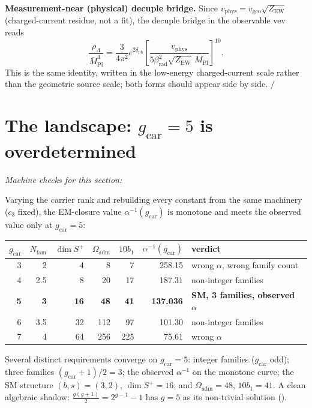 \documentclass[11pt,a4paper]{article}
\newcommand{\Mbar}{\bar M_{\mathrm{Pl}}}
\newcommand{\gcar}{g_{\mathrm{car}}}
\newcommand{\Nfam}{N_{\mathrm{fam}}}
\newcommand{\Oadm}{\Omega_{\mathrm{adm}}}
\newcommand{\cthree}{c_3}
\newcommand{\dph}{\delta_{\mathrm{ph}}}
\newcommand{\betarad}{\beta_{\mathrm{rad}}}
\theoremstyle{definition}
\begin{document}
\noindent\textbf{Measurement-near (physical) decuple bridge.} Since $v_{\mathrm{phys}}=v_{\mathrm{geo}}\sqrt{Z_{\mathrm{EW}}}$
(charged-current residue, not a fit), the decuple bridge in the observable vev reads
\begin{equation}
  \frac{\rho_\Lambda}{\Mbar^4}=\frac{3}{4\pi^2}e^{2\dph}
  \left[\frac{v_{\mathrm{phys}}}{5\betarad^2\sqrt{Z_{\mathrm{EW}}}\,\Mbar}\right]^{10}.
\end{equation}
This is the same identity, written in the low-energy charged-current scale rather than the geometric
source scale; both forms should appear side by side. \mE/\mC

\section{The landscape: $\gcar=5$ is overdetermined}
\noindent\emph{Machine checks for this section:}  


Varying the carrier rank and rebuilding every constant from the same machinery ($\cthree$ fixed),
the EM-closure value $\alpha^{-1}(\gcar)$ is monotone and meets the observed value only at $\gcar=5$:
\begin{center}\small
\begin{tabular}{@{}r r r r r r l@{}}
\toprule
$\gcar$ & $\Nfam$ & $\dim S^+$ & $\Oadm$ & $10b_1$ & $\alpha^{-1}(\gcar)$ & verdict \\
\midrule
3 & 2 & 4 & 8 & 7 & 258.15 & wrong $\alpha$, wrong family count \\
4 & 2.5 & 8 & 20 & 17 & 187.31 & non-integer families \\
\textbf{5} & \textbf{3} & \textbf{16} & \textbf{48} & \textbf{41} & \textbf{137.036} & \textbf{SM, 3 families, observed $\alpha$} \\
6 & 3.5 & 32 & 112 & 97 & 101.30 & non-integer families \\
7 & 4 & 64 & 256 & 225 & 75.61 & wrong $\alpha$ \\
\bottomrule
\end{tabular}
\end{center}
Several distinct requirements converge on $\gcar=5$: integer families ($\gcar$ odd); three families
$(\gcar{+}1)/2=3$; the observed $\alpha^{-1}$ on the monotone curve; the SM structure $(b,s)=(3,2)$,
$\dim S^+=16$; and $\Oadm=48$, $10b_1=41$. A clean algebraic shadow:
$\tfrac{g(g+1)}{2}=2^{g-1}-1$ has $g=5$ as its non-trivial solution (\mC).
\end{document}
